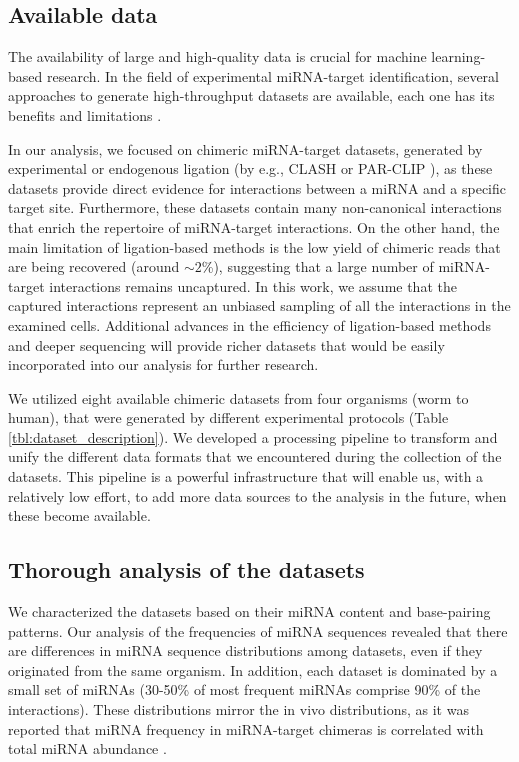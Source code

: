 \documentclass{bmcart}
\begin{document}
\subsection*{Available data}
The availability of large and high-quality data is crucial for machine learning-based research. In the field of experimental miRNA-target identification, several approaches to generate high-throughput datasets are available, each one has its benefits and limitations \cite{li2019current, martinez2013microrna}. 

In our analysis, we focused on chimeric miRNA-target datasets, generated by experimental or endogenous ligation (by e.g., CLASH \cite{helwak2013mapping} or PAR-CLIP \cite{grosswendt2014unambiguous}), as these datasets provide direct evidence for interactions between a miRNA and a specific target site. Furthermore, these datasets contain many non-canonical interactions that enrich the repertoire of miRNA-target interactions. On the other hand, the main limitation of ligation-based methods is the low yield of chimeric reads that are being recovered (around $\sim 2$\%), suggesting that a large number of miRNA-target interactions remains uncaptured. In this work, we assume that the captured interactions represent an unbiased sampling of all the interactions in the examined cells. Additional advances in the efficiency of ligation-based methods and deeper sequencing will provide richer datasets that would be easily incorporated into our analysis for further research.  

We utilized eight available chimeric datasets from four organisms (worm to human), that were generated by different experimental protocols (Table \ref{tbl:dataset_description}). We developed a processing pipeline to transform and unify the different data formats that we encountered during the collection of the datasets. This pipeline is a powerful infrastructure that will enable us, with a relatively low effort, to add more data sources to the analysis in the future, when these become available. 

\subsection*{Thorough analysis of the datasets}
We characterized the datasets based on their miRNA content and base-pairing patterns.
Our analysis of the frequencies of miRNA sequences revealed that there are differences in miRNA sequence distributions among datasets, even if they originated from the same organism. In addition, each dataset is dominated by a small set of miRNAs (30-50\% of most frequent miRNAs comprise 90\% of the interactions). These distributions mirror the in vivo distributions, as it was reported that miRNA frequency in miRNA-target chimeras is correlated with total miRNA abundance \cite{darnell_moore2015mirna}.
\end{document}
